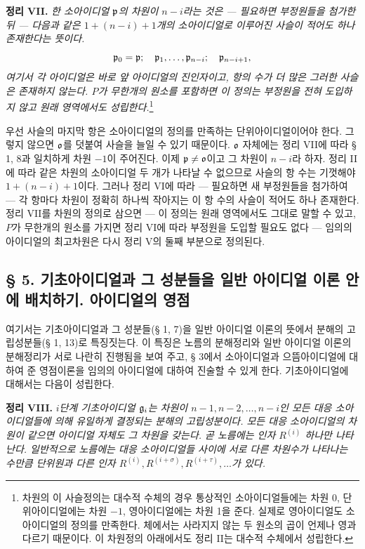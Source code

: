 \textbf{정리 VII.} \emph{한 소아이디얼 \(\mathfrak p\)의 차원이 \(n-i\)라는 것은 --- 필요하면 부정원들을 첨가한 뒤 --- 다음과 같은 \(1+(n-i)+1\)개의 소아이디얼로 이루어진 사슬이 적어도 하나 존재한다는 뜻이다.}
\[
 \mathfrak p_0=\mathfrak p;\quad \mathfrak p_1,\ldots,\mathfrak p_{n-i};\quad \mathfrak p_{n-i+1},
\]
\emph{여기서 각 아이디얼은 바로 앞 아이디얼의 진인자이고, 항의 수가 더 많은 그러한 사슬은 존재하지 않는다. \(P\)가 무한개의 원소를 포함하면 이 정의는 부정원을 전혀 도입하지 않고 원래 영역에서도 성립한다.}\footnote{차원의 이 사슬정의는 대수적 수체의 경우 통상적인 소아이디얼들에는 차원 0, 단위아이디얼에는 차원 \(-1\), 영아이디얼에는 차원 1을 준다. 실제로 영아이디얼도 소아이디얼의 정의를 만족한다. 체에서는 사라지지 않는 두 원소의 곱이 언제나 영과 다르기 때문이다. 이 차원정의 아래에서도 정리 II는 대수적 수체에서 성립한다.}

우선 사슬의 마지막 항은 소아이디얼의 정의를 만족하는 단위아이디얼이어야 한다. 그렇지 않으면 \(\mathfrak o\)를 덧붙여 사슬을 늘일 수 있기 때문이다. \(\mathfrak o\) 자체에는 정리 VII에 따라 § 1, 8과 일치하게 차원 \(-1\)이 주어진다. 이제 \(\mathfrak p\ne\mathfrak o\)이고 그 차원이 \(n-i\)라 하자. 정리 II에 따라 같은 차원의 소아이디얼 두 개가 나타날 수 없으므로 사슬의 항 수는 기껏해야 \(1+(n-i)+1\)이다. 그러나 정리 VI에 따라 --- 필요하면 새 부정원들을 첨가하여 --- 각 항마다 차원이 정확히 하나씩 작아지는 이 항 수의 사슬이 적어도 하나 존재한다. 정리 VII를 차원의 정의로 삼으면 --- 이 정의는 원래 영역에서도 그대로 말할 수 있고, \(P\)가 무한개의 원소를 가지면 정리 VI에 따라 부정원을 도입할 필요도 없다 --- 임의의 아이디얼의 최고차원은 다시 정리 V의 둘째 부분으로 정의된다.

\subsection*{§ 5. 기초아이디얼과 그 성분들을 일반 아이디얼 이론 안에 배치하기. 아이디얼의 영점}

여기서는 기초아이디얼과 그 성분들(§ 1, 7)을 일반 아이디얼 이론의 뜻에서 분해의 고립성분들(§ 1, 13)로 특징짓는다. 이 특징은 노름의 분해정리와 일반 아이디얼 이론의 분해정리가 서로 나란히 진행됨을 보여 주고, § 3에서 소아이디얼과 으뜸아이디얼에 대하여 준 영점이론을 임의의 아이디얼에 대하여 진술할 수 있게 한다. 기초아이디얼에 대해서는 다음이 성립한다.

\textbf{정리 VIII.} \emph{\(i\)단계 기초아이디얼 \(\mathfrak g_i\)는 차원이 \(n-1,n-2,\ldots,n-i\)인 모든 대응 소아이디얼들에 의해 유일하게 결정되는 분해의 고립성분이다. 모든 대응 소아이디얼의 차원이 같으면 아이디얼 자체도 그 차원을 갖는다. 곧 노름에는 인자 \(R^{(i)}\) 하나만 나타난다. 일반적으로 노름에는 대응 소아이디얼들 사이에 서로 다른 차원수가 나타나는 수만큼 단위원과 다른 인자 \(R^{(i)},R^{(i+\sigma)},R^{(i+\tau)},\ldots\)가 있다.}


